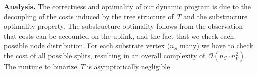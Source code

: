 \documentclass[preprint,12pt]{elsarticle}
\newcommand{\Tree}{\ensuremath{T}}
\newcommand{\CostTrans}{\ensuremath{b_1}}
\newcommand{\CostCom}{\ensuremath{b_2}}
\begin{document}



%

%




\textbf{Analysis.}
The correctness and optimality of our dynamic program
is due to the decoupling of the costs induced by the tree
structure of~$\Tree$ and the  substructure
optimality property.
The substructure optimality follows from the observation that
costs can be accounted on the uplink, and the fact
 that we check each possible node distribution.
For each substrate vertex ($n_S$ many) we have
to check the cost of all possible splits,
resulting in an overall complexity of~$\mathcal{O}(n_S \cdot n_V^2)$.
The runtime to binarize~$\Tree$ is asymptotically negligible.
\end{document}
